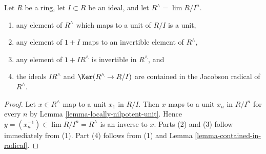 \begin{lemma}
\label{lemma-radical-completion}
Let $R$ be a ring, let $I \subset R$ be an ideal, and let
$R^\wedge = \lim R/I^n$.
\begin{enumerate}
\item any element of $R^\wedge$ which maps to a unit of $R/I$ is a unit,
\item any element of $1 + I$ maps to an invertible element of $R^\wedge$,
\item any element of $1 + IR^\wedge$ is invertible in $R^\wedge$, and
\item the ideals $IR^\wedge$ and $\Ker(R^\wedge \to R/I)$ are contained
in the Jacobson radical of $R^\wedge$.
\end{enumerate}
\end{lemma}

\begin{proof}
Let $x \in R^\wedge$ map to a unit $x_1$ in $R/I$.
Then $x$ maps to a unit $x_n$ in $R/I^n$ for every $n$ by
Lemma \ref{lemma-locally-nilpotent-unit}.
Hence $y = (x_n^{-1}) \in \lim R/I^n = R^\wedge$ is an inverse to $x$.
Parts (2) and (3) follow immediately from (1).
Part (4) follows from (1) and Lemma \ref{lemma-contained-in-radical}.
\end{proof}
